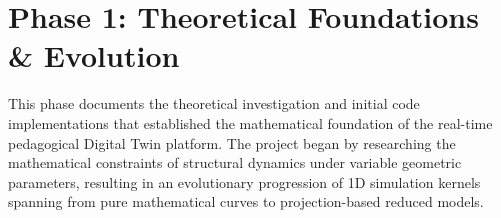 \section{Phase 1: Theoretical Foundations \& Evolution}
\label{sec:phase1}

This phase documents the theoretical investigation and initial code implementations that established the mathematical foundation of the real-time pedagogical Digital Twin platform. The project began by researching the mathematical constraints of structural dynamics under variable geometric parameters, resulting in an evolutionary progression of 1D simulation kernels spanning from pure mathematical curves to projection-based reduced models.




